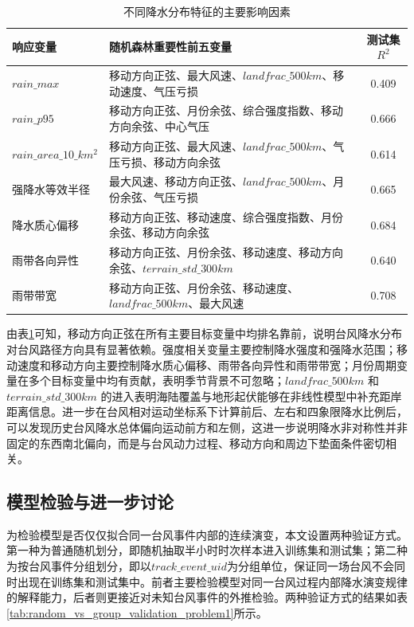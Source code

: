 \documentclass[UTF8,a4paper,zihao=5,fontset=fandol]{ctexart}
\numberwithin{equation}{section}
\numberwithin{figure}{section}
\numberwithin{table}{section}
\begin{document}
\begin{table}[htbp]
    \centering
    \caption{不同降水分布特征的主要影响因素}
    \label{tab:rf_top_factors_problem1}
    \begin{tabular}{p{}p{}c}
        \hline
        响应变量 & 随机森林重要性前五变量 & 测试集$R^2$ \\
        \hline
        $rain\_max$ & 移动方向正弦、最大风速、$landfrac\_500km$、移动速度、气压亏损 & 0.409 \\
        $rain\_p95$ & 移动方向正弦、月份余弦、综合强度指数、移动方向余弦、中心气压 & 0.666 \\
        $rain\_area\_10\_km^2$ & 移动方向正弦、最大风速、$landfrac\_500km$、气压亏损、移动方向余弦 & 0.614 \\
        强降水等效半径 & 最大风速、移动方向正弦、$landfrac\_500km$、月份余弦、气压亏损 & 0.665 \\
        降水质心偏移 & 移动方向正弦、移动速度、综合强度指数、月份余弦、移动方向余弦 & 0.684 \\
        雨带各向异性 & 移动方向正弦、月份余弦、移动速度、移动方向余弦、$terrain\_std\_300km$ & 0.640 \\
        雨带带宽 & 移动方向正弦、月份余弦、移动速度、$landfrac\_500km$、最大风速 & 0.708 \\
        \hline
    \end{tabular}
\end{table}

由表\ref{tab:rf_top_factors_problem1}可知，移动方向正弦在所有主要目标变量中均排名靠前，说明台风降水分布对台风路径方向具有显著依赖。强度相关变量主要控制降水强度和强降水范围；移动速度和移动方向主要控制降水质心偏移、雨带各向异性和雨带带宽；月份周期变量在多个目标变量中均有贡献，表明季节背景不可忽略；$landfrac\_500km$ 和 $terrain\_std\_300km$ 的进入表明海陆覆盖与地形起伏能够在非线性模型中补充距岸距离信息。进一步在台风相对运动坐标系下计算前后、左右和四象限降水比例后，可以发现历史台风降水总体偏向运动前方和左侧，这进一步说明降水非对称性并非固定的东西南北偏向，而是与台风动力过程、移动方向和周边下垫面条件密切相关。

\subsection{模型检验与进一步讨论}

为检验模型是否仅仅拟合同一台风事件内部的连续演变，本文设置两种验证方式。第一种为普通随机划分，即随机抽取半小时时次样本进入训练集和测试集；第二种为按台风事件分组划分，即以$track\_event\_uid$为分组单位，保证同一场台风不会同时出现在训练集和测试集中。前者主要检验模型对同一台风过程内部降水演变规律的解释能力，后者则更接近对未知台风事件的外推检验。两种验证方式的结果如表\ref{tab:random_vs_group_validation_problem1}所示。
\end{document}
